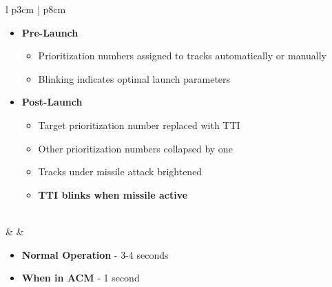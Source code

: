 \documentclass[8pt,usenames,dvipsnames,twoside]{article}
\begin{document}
\begin{center}
\begin{longtable}{l p{3cm} | p{8cm}}
				\begin{minipage}[t]{\linewidth}
					\vspace{-7pt}
					\begin{itemize}
						\item \textbf{Pre-Launch}
						\begin{itemize}
							\item Prioritization numbers assigned to tracks automatically or manually
							\item Blinking indicates optimal launch parameters
						\end{itemize}
						\item \textbf{Post-Launch}
						\begin{itemize}
							\item Target prioritization number replaced with TTI
							\item Other prioritization numbers collapsed by one
							\item Tracks under missile attack brightened
							\item \textbf{TTI blinks when missile active}
						\end{itemize}
					\end{itemize}
				\end{minipage} \\
				\midrule
				\textbullet &  & 
				\begin{minipage}[t]{\linewidth}
					\vspace{-7pt}
					\begin{itemize}
						\item \textbf{Normal Operation} - 3-4 seconds
						\item \textbf{When in ACM} - 1 second
					\end{itemize}
				\end{minipage} \\
				\bottomrule
			\end{longtable}
		\end{center}
		
\end{document}

